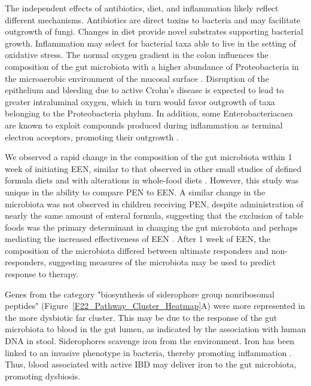 The independent effects of antibiotics, diet, and inflammation likely reflect different mechanisms. Antibiotics are direct toxins to bacteria and may facilitate outgrowth of fungi. Changes in diet provide novel substrates supporting bacterial growth. Inflammation may select for bacterial taxa able to live in the setting of oxidative stress. The normal oxygen gradient in the colon influences the composition of the gut microbiota with a higher abundance of Proteobacteria in the microaerobic environment of the mucosal surface \citep{Albenberg:2014bp}. Disruption of the epithelium and bleeding due to active Crohn's disease is expected to lead to greater intraluminal oxygen, which in turn would favor outgrowth of taxa belonging to the Proteobacteria phylum. In addition, some Enterobacteriacaea are known to exploit compounds produced during inflammation as terminal electron acceptors, promoting their outgrowth \citep{Winter:2014ed}.


We observed a rapid change in the composition of the gut microbiota within 1 week of initiating EEN, similar to that observed in other small studies of defined formula diets \citep{Gerasimidis:2014gi} and with alterations in whole-food diets \citep{David:2014cl,wu2011linking}. However, this study was unique in the ability to compare PEN to EEN. A similar change in the microbiota was not observed in children receiving PEN, despite administration of nearly the same amount of enteral formula, suggesting that the exclusion of table foods was the primary determinant in changing the gut microbiota and perhaps mediating the increased effectiveness of EEN \citep{lee2015comparative}. After 1 week of EEN, the composition of the microbiota differed between ultimate responders and non-responders, suggesting measures of the microbiota may be used to predict response to therapy. 


Genes from the category "biosynthesis of siderophore group nonribosomal peptides" (Figure~\ref{F22_Pathway_Cluster_Heatmap}A) were more represented in the more dysbiotic far cluster. This may be due to the response of the gut microbiota to blood in the gut lumen, as indicated by the association with human DNA in stool. Siderophores scavenge iron from the environment. Iron has been linked to an invasive phenotype in bacteria, thereby promoting inflammation \citep{Nairz:2010cf}. Thus, blood associated with active IBD may deliver iron to the gut microbiota, promoting dysbiosis. 


